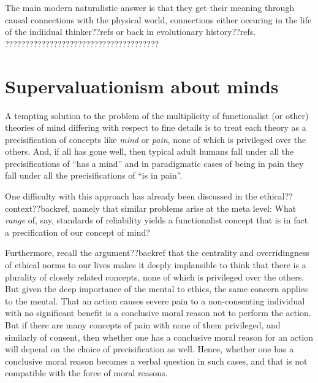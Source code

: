 The main modern naturalistic answer is that they get their meaning through causal connections with the physical
world, connections either occuring in the life of the indiidual thinker??refs or back in evolutionary history??refs. 
??????????????????????????????????????

\section{Supervaluationism about minds}
A tempting solution to the problem of the multiplicity of functionalist (or other) theories of mind differing with respect
to fine details is to treat each theory as a precisification of concepts like \textit{mind} or \textit{pain}, none of which
is privileged over the others. And,
if all has gone well, then typical adult humans fall under all the precisifications of ``has a mind'' and in paradigmatic
cases of being in pain they fall under all the precisifications of ``is in pain''. 

One difficulty with this approach has already been discussed in the ethical?? context??backref, namely that similar problems
arise at the meta level: What \textit{range} of, say, standards of reliability yields a functionalist concept that is in fact a 
precification of our concept of mind? 

Furthermore, recall the argument??backref that the centrality and overridingness of ethical norms to our lives makes it 
deeply implausible to think that there is a plurality of closely related concepts, none of which is privileged over the others.
But given the deep importance of the mental to ethics, the same concern applies to the mental. That an action causes severe
pain to a non-consenting individual with no significant benefit is a conclusive moral reason not to perform the action. 
But if there are many concepts of pain with none of them privileged, and similarly of consent, then whether one has a
conclusive moral reason for an action will depend on the choice of precisification as well. Hence, whether one has a 
conclusive moral reason becomes a verbal question in such cases, and that is not compatible with the force of moral
reasons.

